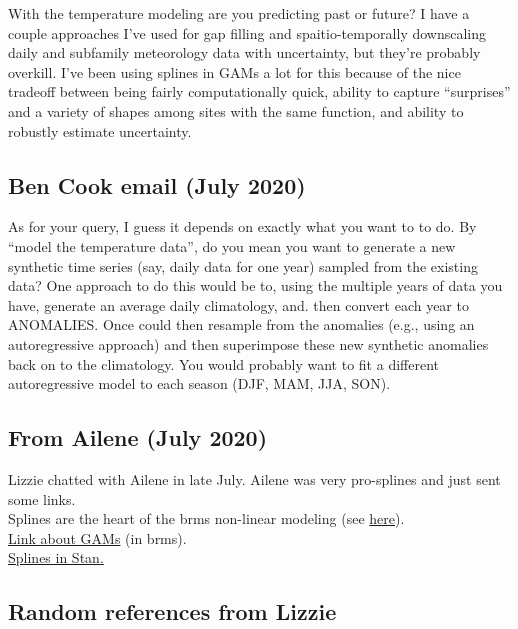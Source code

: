 \documentclass[11pt,letter]{article}
\begin{document}
With the temperature modeling are you predicting past or future?  I have a couple approaches I've used for gap filling and spaitio-temporally downscaling daily and subfamily meteorology data with uncertainty, but they're probably overkill.  I've been using splines in GAMs a lot for this because of the nice tradeoff between being fairly computationally quick, ability to capture ``surprises''  and a variety of shapes among sites with the same function, and ability to robustly estimate uncertainty.\\

\subsection{Ben Cook email (July 2020)}

As for your query, I guess it depends on exactly what you want to to do. By ``model the temperature data'', do you mean you want to generate a new synthetic time series (say, daily data for one year) sampled from the existing data? One approach to do this would be to, using the multiple years of data you have, generate an average daily climatology, and. then convert each year to ANOMALIES. Once could then resample from the anomalies (e.g., using an autoregressive approach) and then superimpose these new synthetic anomalies back on to the climatology. You would probably want to fit a different autoregressive model to each season (DJF, MAM, JJA, SON). \\

\subsection{From Ailene (July 2020)}
Lizzie chatted with Ailene in late July. Ailene was very pro-splines and just sent some links.\\

Splines are the heart of the brms non-linear modeling (see \href{https://mran.microsoft.com/snapshot/2017-05-14/web/packages/brms/vignettes/brms_multilevel.pdf}{here}).\\

\href{https://fromthebottomoftheheap.net/2018/04/21/fitting-gams-with-brms/}{Link about GAMs} (in brms).\\

\href{https://github.com/milkha/Splines_in_Stan/blob/master/splines_in_stan.pdf}{Splines in Stan.}\\

\subsection{Random references from Lizzie}
\end{document}
